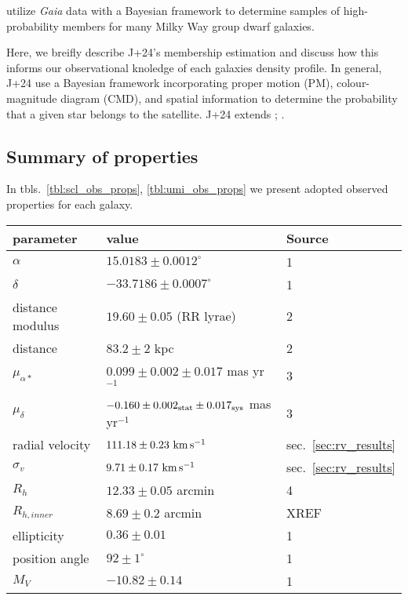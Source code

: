\citet[hereafter J+24]{jensen+2024} utilize \emph{Gaia} data with a
Bayesian framework to determine samples of high-probability members for
many Milky Way group dwarf galaxies.

Here, we breifly describe J+24's membership estimation and discuss how
this informs our observational knoledge of each galaxies density
profile. In general, J+24 use a Bayesian framework incorporating proper
motion (PM), colour-magnitude diagram (CMD), and spatial information to
determine the probability that a given star belongs to the satellite.
J+24 extends \citet{MV2020a}; \citet{MV2020b}. \citep[See also similar
work by][]{pace+li2019, battaglia+2022, pace+erkal+li2022, qi+2022}

\subsection{Summary of properties}\label{summary-of-properties}

In tbls.~\ref{tbl:scl_obs_props}, \ref{tbl:umi_obs_props} we present
adopted observed properties for each galaxy.

\begin{table*}[t]
\centering
\caption[Observed Properties of Sculptor]{\label{tbl:scl_obs_props}Observed properties of Sculptor. References are: 1. Ricardo R. Muñoz et al. (2018), 2. Tran et al. (2022), 3. McConnachie and Venn (2020b), 4 McConnachie and Venn (2020a). }
\label{tbl:scl_obs_props}
\begin{tabular}{lll}
\toprule
parameter & value & Source\\
\midrule
$\alpha$ & $15.0183 \pm 0.0012^\circ$ & 1\\
$\delta$ & $-33.7186 \pm 0.0007^\circ$ & 1\\
distance modulus & $19.60 \pm 0.05$ (RR lyrae) & 2\\
distance & $83.2 \pm 2$ kpc & 2\\
$\mu_{\alpha*}$ & $0.099 \pm 0.002 \pm 0.017$ mas yr$^{-1}$ & 3\\
$\mu_\delta$ & $-0.160 \pm 0.002_{\rm stat} \pm 0.017_{\rm sys}$ mas yr$^{-1}$ & 3\\
radial velocity & $111.18 \pm 0.23\ {\rm km\,s^{-1}}$ & sec. \ref{sec:rv_results}\\
$\sigma_v$ & $9.71\pm0.17\ {\rm km\,s^{-1}}$ & sec. \ref{sec:rv_results}\\
$R_h$ & $12.33 \pm 0.05$ arcmin & 4\\
$R_{h,inner}$ & $8.69 \pm 0.2$ arcmin & XREF\\
ellipticity & $0.36 \pm 0.01$ & 1\\
position angle & $92\pm1^\circ$ & 1\\
$M_V$ & $-10.82\pm0.14$ & 1\\
\bottomrule
\end{tabular}
\end{table*}

